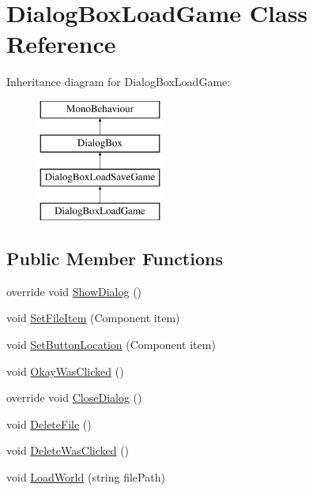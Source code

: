 \hypertarget{class_dialog_box_load_game}{}\section{Dialog\+Box\+Load\+Game Class Reference}
\label{class_dialog_box_load_game}
Inheritance diagram for Dialog\+Box\+Load\+Game\+:\begin{figure}[H]
\begin{center}
\leavevmode
\includegraphics[height=4.000000cm]{class_dialog_box_load_game}
\end{center}
\end{figure}
\subsection*{Public Member Functions}
\begin{DoxyCompactItemize}
\item 
override void \hyperlink{class_dialog_box_load_game_af9b80f18655ef0ae924e49142fd12bf0}{Show\+Dialog} ()
\item 
void \hyperlink{class_dialog_box_load_game_a9a6dca217a606a303bb60cbc96c32e10}{Set\+File\+Item} (Component item)
\item 
void \hyperlink{class_dialog_box_load_game_a65c2977ff49232db0e18ea9f77bbb260}{Set\+Button\+Location} (Component item)
\item 
void \hyperlink{class_dialog_box_load_game_aaaa212521c2e67fdc685c587fdffe84b}{Okay\+Was\+Clicked} ()
\item 
override void \hyperlink{class_dialog_box_load_game_ad98016aa393e94764e206cc9ef47185d}{Close\+Dialog} ()
\item 
void \hyperlink{class_dialog_box_load_game_ad009c68702d76f76a3f0a09581ee1200}{Delete\+File} ()
\item 
void \hyperlink{class_dialog_box_load_game_a0e76781bf0bde59360af45461f59ae22}{Delete\+Was\+Clicked} ()
\item 
void \hyperlink{class_dialog_box_load_game_a39ab00acf57e549fd6ddaf93dc864ed8}{Load\+World} (string file\+Path)
\end{DoxyCompactItemize}
